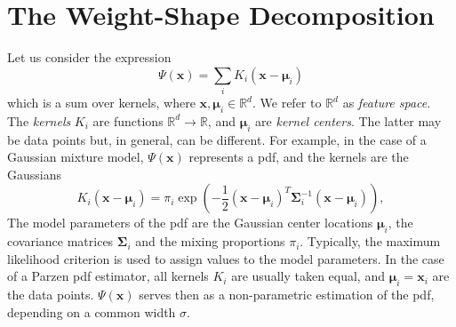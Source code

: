 \documentclass[preprint,12pt]{elsarticle}
\begin{document}
\section{The Weight-Shape Decomposition}
\label{wsd}
Let us consider the expression
\begin{equation}\label{sum_of_kernels}
  \Psi\left(\mathbf{x}\right) = \sum_i K_i \left( \mathbf{x}-\boldsymbol{\mu}_i \right) 
\end{equation}
which is a sum over kernels, where $\mathbf{x},\boldsymbol{\mu}_i\in\mathbb{R}^d$. We refer to $\mathbb{R}^d$ as \textit{feature space}. The \textit{kernels} $K_i$ are functions $\mathbb{R}^d\rightarrow\mathbb{R}$, and $\boldsymbol{\mu}_i$ are \textit{kernel centers}. The latter may be data points but, in general, can be different. For example, in the case of a Gaussian mixture model, $\Psi(\mathbf{x})$ represents a pdf, and the kernels are the Gaussians
\begin{equation}\label{gaussian_kernel}
  K_i \left( \mathbf{x}-\boldsymbol{\mu}_i \right) = \pi_i\exp\left(-\frac{1}{2}\left(\mathbf{x}-\boldsymbol{\mu}_i\right)^T\boldsymbol{\Sigma}_i^{-1}\left(\mathbf{x}-\boldsymbol{\mu}_i\right)\right),
\end{equation}
The model parameters of the pdf are the Gaussian center locations $\boldsymbol{\mu}_i$, the covariance matrices $\boldsymbol{\Sigma}_i$ and the mixing proportions $\pi_i$. Typically, the maximum likelihood criterion is used to assign values to the model parameters. In the case of a Parzen pdf estimator, all kernels $K_i$ are usually taken equal, and $\boldsymbol{\mu}_i=\mathbf{x}_i$ are the data points. $\Psi\left(\mathbf{x}\right)$ serves then as a non-parametric estimation of the pdf, depending on a common width $\sigma$.
\end{document}
